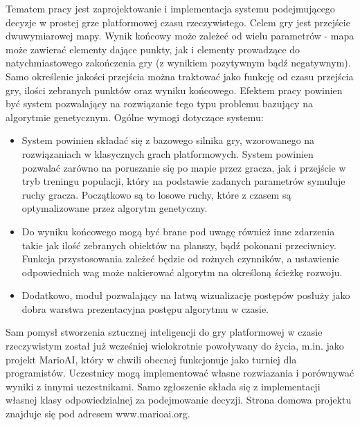 \begin{par}
	Tematem pracy jest zaprojektowanie i implementacja systemu podejmującego decyzje w prostej grze platformowej czasu rzeczywistego.
	Celem gry jest przejście dwuwymiarowej mapy. Wynik końcowy może zależeć od wielu parametrów - mapa może zawierać elementy dające punkty, jak i elementy prowadzące do natychmiastowego zakończenia gry (z wynikiem pozytywnym bądź negatywnym).
	Samo określenie jakości przejścia można traktować jako funkcję od czasu przejścia gry, ilości zebranych punktów oraz wyniku końcowego.
	Efektem pracy powinien być system pozwalający na rozwiązanie tego typu problemu bazujący na algorytmie genetycznym.
	\newline
	Ogólne wymogi dotyczące systemu:
	\begin{itemize}
		\item
			System powinien składać się z bazowego silnika gry, wzorowanego na rozwiązaniach w klasycznych grach platformowych.
			System powinien pozwalać zarówno na poruszanie się po mapie przez gracza, jak i przejście w tryb treningu populacji, który na podstawie zadanych parametrów symuluje ruchy gracza. Początkowo są to losowe ruchy, które z czasem są optymalizowane przez algorytm genetyczny.
		\item
			Do wyniku końcowego mogą być brane pod uwagę również inne zdarzenia takie jak ilość zebranych obiektów na planszy, bądź 
			pokonani przeciwnicy.
			Funkcja przystosowania zależeć będzie od rożnych czynników, a ustawienie odpowiednich wag może nakierować algorytm na określoną ścieżkę rozwoju.
		\item
			Dodatkowo, moduł pozwalający na łatwą wizualizację postępów posłuży jako dobra warstwa prezentacyjna postępu algorytmu w czasie.
	\end{itemize}
\end{par}

\begin{par}
	Sam pomysł stworzenia sztucznej inteligencji do gry platformowej w czasie rzeczywistym został już wcześniej wielokrotnie powoływany do życia, m.in. jako projekt MarioAI,
	który w chwili obecnej funkcjonuje jako turniej dla programistów. Uczestnicy mogą implementować własne rozwiazania i porównywać wyniki z innymi uczestnikami.
	Samo zgłoszenie składa się z implementacji własnej klasy odpowiedzialnej za podejmowanie decyzji.
	Strona domowa projektu znajduje się pod adresem www.marioai.org.
\end{par}
